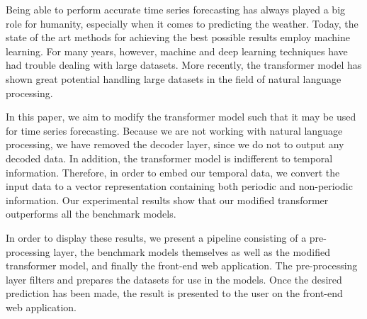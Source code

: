 Being able to perform accurate time series forecasting has always played a big role for humanity, especially when it comes to predicting the weather. 
Today, the state of the art methods for achieving the best possible results employ machine learning. 
For many years, however, machine and deep learning techniques have had trouble dealing with large datasets. 
More recently, the transformer model has shown great potential handling large datasets in the field of natural language processing.

In this paper, we aim to modify the transformer model such that it may be used for time series forecasting. 
Because we are not working with natural language processing, we have removed the decoder layer, since we do not to output any decoded data. 
In addition, the transformer model is indifferent to temporal information. 
Therefore, in order to embed our temporal data, we convert the input data to a vector representation containing both periodic and non-periodic information.
Our experimental results show that our modified transformer outperforms all the benchmark models.

In order to display these results, we present a pipeline consisting of a pre-processing layer, the benchmark models themselves as well as the modified transformer model, and finally the front-end web application.
The pre-processing layer filters and prepares the datasets for use in the models.
Once the desired prediction has been made, the result is presented to the user on the front-end web application.